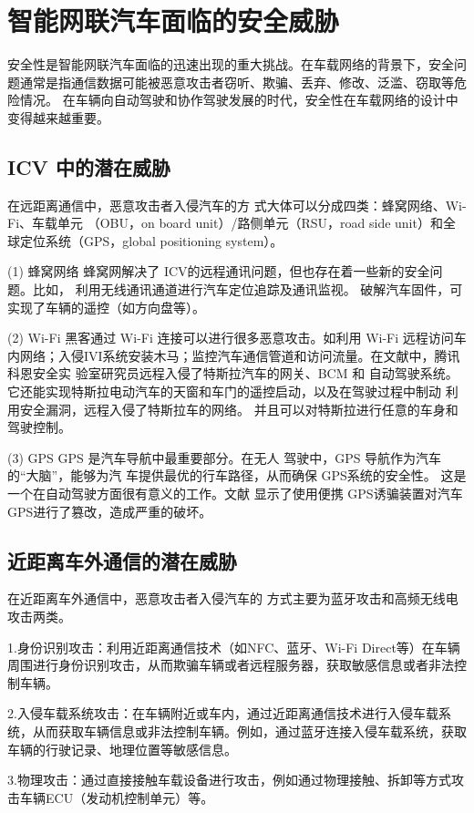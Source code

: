 \section{智能网联汽车面临的安全威胁}
安全性是智能网联汽车面临的迅速出现的重大挑战。在车载网络的背景下，安全问题通常是指通信数据可能被恶意攻击者窃听、欺骗、丢弃、修改、泛滥、窃取等危险情况。
在车辆向自动驾驶和协作驾驶发展的时代，安全性在车载网络的设计中变得越来越重要。

\subsection{ICV 中的潜在威胁}
在远距离通信中，恶意攻击者入侵汽车的方
式大体可以分成四类：蜂窝网络、Wi-Fi、车载单元
（OBU，on board unit）/路侧单元（RSU，road side
unit）和全球定位系统（GPS，global positioning
system）。

(1) 蜂窝网络
蜂窝网解决了 ICV的远程通讯问题，但也存在着一些新的安全问题。比如，
利用无线通讯通道进行汽车定位追踪及通讯监视。
破解汽车固件，可实现了车辆的遥控（如方向盘等）。


(2) Wi-Fi
黑客通过 Wi-Fi 连接可以进行很多恶意攻击。如利用 Wi-Fi 远程访问车内网络；入侵IVI系统安装木马；监控汽车通信管道和访问流量。在文献\cite{keen}中，腾讯科恩安全实
验室研究员远程入侵了特斯拉汽车的网关、BCM 和
自动驾驶系统。它还能实现特斯拉电动汽车的天窗和车门的遥控启动，以及在驾驶过程中制动
利用安全漏洞，远程入侵了特斯拉车的网络。
并且可以对特斯拉进行任意的车身和驾驶控制。

(3) GPS
GPS 是汽车导航中最重要部分。在无人
驾驶中，GPS 导航作为汽车的“大脑”，能够为汽
车提供最优的行车路径，从而确保 GPS系统的安全性。
这是一个在自动驾驶方面很有意义的工作。文献\cite{cuigai}
显示了使用便携 GPS诱骗装置对汽车 GPS进行了篡改，造成严重的破坏。

\subsection{近距离车外通信的潜在威胁}
在近距离车外通信中，恶意攻击者入侵汽车的
方式主要为蓝牙攻击和高频无线电攻击两类。

1.身份识别攻击：利用近距离通信技术（如NFC、蓝牙、Wi-Fi Direct等）在车辆周围进行身份识别攻击，从而欺骗车辆或者远程服务器，获取敏感信息或者非法控制车辆。

2.入侵车载系统攻击：在车辆附近或车内，通过近距离通信技术进行入侵车载系统，从而获取车辆信息或非法控制车辆。例如，通过蓝牙连接入侵车载系统，获取车辆的行驶记录、地理位置等敏感信息。

3.物理攻击：通过直接接触车载设备进行攻击，例如通过物理接触、拆卸等方式攻击车辆ECU（发动机控制单元）等。

